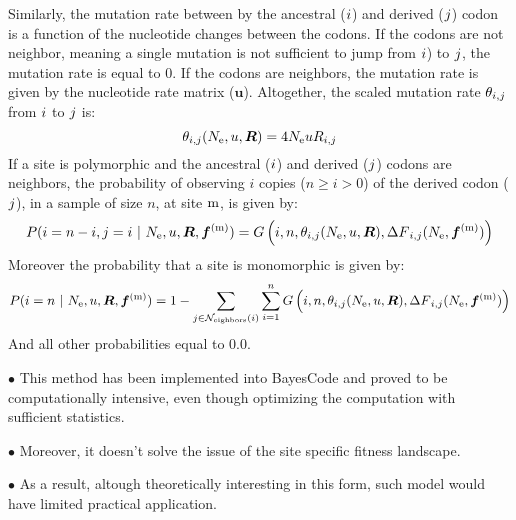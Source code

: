 Similarly, the mutation rate between by the ancestral (${i}$) and derived (${j}$) \gls{codon} is a function of the nucleotide changes between the \glspl{codon}. If the \glspl{codon} are not neighbor, meaning a single mutation is not sufficient to jump from ${i}$) to ${j}$, the mutation rate is equal to $0$. If the \glspl{codon} are neighbors, the mutation rate is given by the nucleotide rate matrix ($ \bm{u} $). Altogether, the scaled mutation rate $\theta_{{i}, {j}}$ from ${i}$ to ${j}$ is:
\begin{equation}
	\theta_{{i}, {j}}(N_{\textrm{e}}, u, \bm{R}) = 4 N_{\textrm{e}} u R_{{i}, {j}}
\end{equation}
If a site is \gls{polymorphic} and the ancestral (${i}$) and derived (${j}$) \glspl{codon} are neighbors, the probability of observing $i$ copies ($n \geq i > 0$) of the derived \gls{codon} (${j}$), in a sample of size $n$, at site $\text{m}$, is given by:
\begin{equation}
	P({i}=n-i,{j}=i \ |\ N_{\textrm{e}}, u, \bm{R}, \bm{f}^{(\text{m})}) = G\left(i, n, \theta_{{i}, {j}}(N_{\textrm{e}}, u, \bm{R}), {\Delta F}_{{i}, {j}}(N_{\textrm{e}}, \bm{f}^{(\text{m})}) \right)
\end{equation}
Moreover the probability that a site is monomorphic is given by:
\begin{equation}
	P({i}= n \ |\ N_{\textrm{e}}, u, \bm{R}, \bm{f}^{(\text{m})}) = 1 - \sum\limits_{{j} \in \mathcal{N}_{\mathrm{eighbors}}\left({i}\right)} \sum\limits_{i=1}^{n} G\left(i, n, \theta_{{i}, {j}}(N_{\textrm{e}}, u, \bm{R}), {\Delta F}_{{i}, {j}}(N_{\textrm{e}}, \bm{f}^{(\text{m})})\right)
\end{equation}
And all other probabilities equal to $0.0$.

$\bullet$ This method has been implemented into BayesCode and proved to be computationally intensive, even though optimizing the computation with sufficient statistics.

$\bullet$ Moreover, it doesn't solve the issue of the site specific fitness landscape.

$\bullet$ As a result, altough theoretically interesting in this form, such model would have limited practical application.
